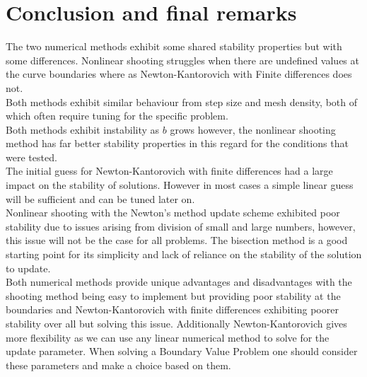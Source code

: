 \documentclass{article}
\begin{document}
\section{Conclusion and final remarks}
The two numerical methods exhibit some shared stability properties but with some differences. Nonlinear shooting struggles when there are undefined values at the curve boundaries where as Newton-Kantorovich with Finite differences does not. \\
Both methods exhibit similar behaviour from step size and mesh  density, both of which often require tuning for the specific problem. \\
Both methods exhibit instability as $b$ grows however, the nonlinear shooting method has far better stability properties in this regard for the conditions that were tested. \\
The initial guess for Newton-Kantorovich with finite differences had a large impact on the stability of solutions. However in most cases a simple linear guess will be sufficient and can be tuned later on. \\
Nonlinear shooting with the Newton's method update scheme exhibited poor stability due to issues arising from division of small and large numbers, however, this issue will not be the case for all problems. The bisection method is a good starting point for its simplicity and lack of reliance on the stability of the solution to update. \\
Both numerical methods provide unique advantages and disadvantages with the shooting method being easy to implement but providing poor stability at the boundaries and Newton-Kantorovich with finite differences exhibiting poorer stability over all but solving this issue. Additionally Newton-Kantorovich gives more flexibility as we can use any linear numerical method to solve for the update parameter. When solving a Boundary Value Problem one should consider these parameters and make a choice based on them. 
\end{document}
